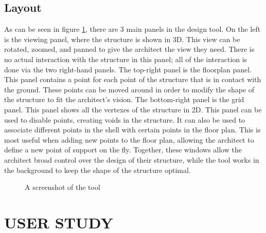 \documentclass{thesis}
\begin{document}
\section{Layout}
As can be seen in figure \ref{FIGURE_screenshot}, there are 3 main panels in the design tool.  On the left is the viewing panel, where the structure
is shown in 3D.  This view can be rotated, zoomed, and panned to give the architect the view they need.  There is no actual interaction with the
structure in this panel; all of the interaction is done via the two right-hand panels.  The top-right panel is the floorplan panel.  This panel
contains a point for each point of the structure that is in contact with the ground.  These points can be moved around in order to modify the shape
of the structure to fit the architect's vision.  The bottom-right panel is the grid panel.  This panel shows all the vertexes of the structure in 2D.
This panel can be used to disable points, creating voids in the structure.  It can also be used to associate different points in the shell with certain
points in the floor plan.  This is most useful when adding new points to the floor plan, allowing the architect to define a new point of support on the
fly.  Together, these windows allow the architect broad control over the design of their structure, while the tool works in the background to keep the
shape of the structure optimal.
\begin{figure}
\caption{A screenshot of the tool}
\label{FIGURE_screenshot}
\end{figure}


\chapter{USER STUDY}
\end{document}
